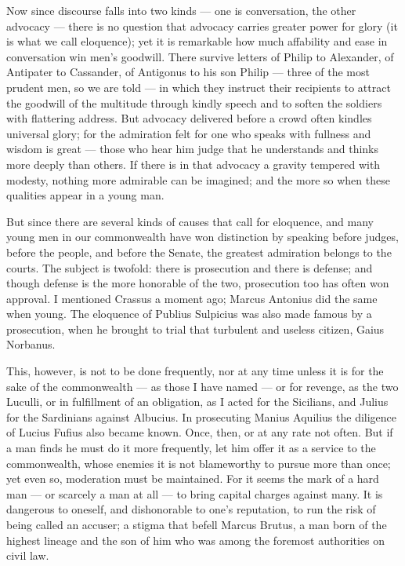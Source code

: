  Now since discourse falls into two kinds — one is conversation, the other advocacy — there is no question that advocacy carries greater power for glory (it is what we call eloquence); yet it is remarkable how much affability and ease in conversation win men's goodwill. There survive letters of Philip to Alexander, of Antipater to Cassander, of Antigonus to his son Philip — three of the most prudent men, so we are told — in which they instruct their recipients to attract the goodwill of the multitude through kindly speech and to soften the soldiers with flattering address. But advocacy delivered before a crowd often kindles universal glory; for the admiration felt for one who speaks with fullness and wisdom is great — those who hear him judge that he understands and thinks more deeply than others. If there is in that advocacy a gravity tempered with modesty, nothing more admirable can be imagined; and the more so when these qualities appear in a young man.

 But since there are several kinds of causes that call for eloquence, and many young men in our commonwealth have won distinction by speaking before judges, before the people, and before the Senate, the greatest admiration belongs to the courts. The subject is twofold: there is prosecution and there is defense; and though defense is the more honorable of the two, prosecution too has often won approval. I mentioned Crassus a moment ago; Marcus Antonius did the same when young. The eloquence of Publius Sulpicius was also made famous by a prosecution, when he brought to trial that turbulent and useless citizen, Gaius Norbanus.

 This, however, is not to be done frequently, nor at any time unless it is for the sake of the commonwealth — as those I have named — or for revenge, as the two Luculli, or in fulfillment of an obligation, as I acted for the Sicilians, and Julius for the Sardinians against Albucius. In prosecuting Manius Aquilius the diligence of Lucius Fufius also became known. Once, then, or at any rate not often. But if a man finds he must do it more frequently, let him offer it as a service to the commonwealth, whose enemies it is not blameworthy to pursue more than once; yet even so, moderation must be maintained. For it seems the mark of a hard man — or scarcely a man at all — to bring capital charges against many. It is dangerous to oneself, and dishonorable to one's reputation, to run the risk of being called an accuser; a stigma that befell Marcus Brutus, a man born of the highest lineage and the son of him who was among the foremost authorities on civil law.

